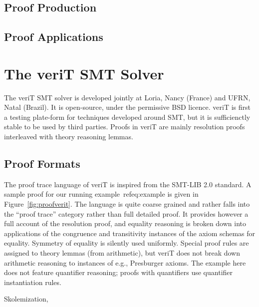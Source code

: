 \documentclass{llncs}
\begin{document}
\subsection{Proof Production}
\subsection{Proof Applications}

\section{The veriT SMT Solver}
\label{sec:veriT}

The veriT SMT solver is developed jointly at Loria, Nancy (France) and UFRN,
Natal (Brazil).  It is open-source, under the permissive BSD licence.  veriT is
first a testing plate-form for techniques developed around SMT, but it is
sufficienctly stable to be used by third parties.  Proofs in veriT are mainly
resolution proofs interleaved with theory reasoning lemmas.

\subsection{Proof Formats}

The proof trace language of veriT is inspired from the SMT-LIB 2.0 standard.  A
sample proof for our running example~ref{eq:example} is given in
Figure~\ref{fig:proofverit}.  The language is quite coarse grained and rather
falls into the ``proof trace'' category rather than full detailed proof.  It
provides however a full account of the resolution proof, and equality reasoning
is broken down into applications of the congruence and transitivity instances of
the axiom schemas for equality.  Symmetry of equality is silently used
uniformly.  Special proof rules are assigned to theory lemmas (from arithmetic),
but veriT does not break down arithmetic reasoning to instances of
e.g., Presburger axioms.  The example here does not feature quantifier
reasoning; proofs with quantifiers use quantifier instantiation rules.

Skolemization, 
\end{document}
